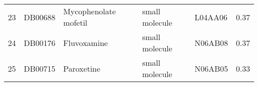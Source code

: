 \documentclass[preprint,12pt]{elsarticle}
\begin{document}
\begin{table}[h]
\begin{tabular}{rllllr}
  23 & DB00688 & Mycophenolate mofetil & small molecule & L04AA06 & 0.37 \\ 
  24 & DB00176 & Fluvoxamine & small molecule & N06AB08 & 0.37 \\ 
  25 & DB00715 & Paroxetine & small molecule & N06AB05 & 0.33 \\ 

\end{tabular}
\end{table}
\end{document}
